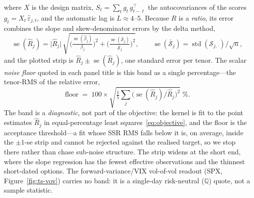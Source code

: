 \documentclass[11pt]{article}
\begin{document}
where $X$ is the design matrix, $S_\ell=\sum_t g_t\,g_{t-\ell}^\top$ the autocovariances of the scores
$g_t=X_t\,\hat\varepsilon_{j,t}$, and the automatic lag is $L\approx 4$--$5$. Because $R$ is a \emph{ratio},
its error combines the slope and skew-denominator errors by the delta method,
\begin{equation}
  \operatorname{se}(\widehat{R}_j)
  = \big|\widehat{R}_j\big|\,
    \sqrt{\Big(\tfrac{\operatorname{se}(\hat\beta_j)}{\beta_j}\Big)^{2}
        + \Big(\tfrac{\operatorname{se}(\bar{\mathcal S}_j)}{\bar{\mathcal S}_j}\Big)^{2}},
  \qquad \operatorname{se}(\bar{\mathcal S}_j)=\operatorname{std}(\mathcal S_{j,\cdot})/\sqrt n,
  \label{eq:hac-delta}
\end{equation}
and the plotted strip is $\widehat{R}_j\pm\operatorname{se}(\widehat{R}_j)$, one standard error per tenor.
The scalar \emph{noise floor} quoted in each panel title is this band as a single percentage---the
tenor-RMS of the relative error,
\begin{equation}
  \mathrm{floor} \;=\; 100\times\sqrt{\tfrac1{5}\textstyle\sum_{j}\big(\operatorname{se}(\widehat{R}_j)/\widehat{R}_j\big)^2}\;\%.
\end{equation}
The band is a \emph{diagnostic}, not part of the objective: the kernel is fit to the point estimates
$\widehat{R}_j$ in equal-percentage least squares~\eqref{eq:objective}, and the floor is the acceptance
threshold---a fit whose SSR RMS falls below it is, on average, inside the $\pm1$-se strip and cannot be
rejected against the realised target, so we stop there rather than chase sub-noise structure. The strip
widens at the short end, where the slope regression has the fewest effective observations and the thinnest
short-dated options. The forward-variance/VIX vol-of-vol readout (SPX, Figure~\ref{fig:ts-vov}) carries no
band: it is a single-day risk-neutral ($\mathbb Q$) quote, not a sample statistic.
\end{document}
